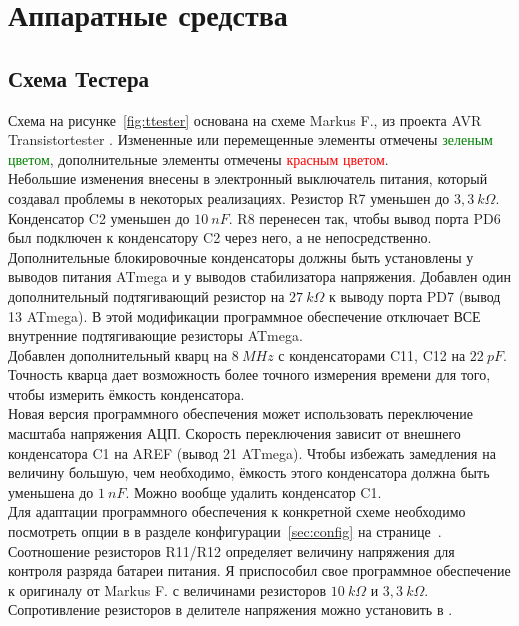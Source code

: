 \chapter{Аппаратные средства}

\section{Схема Тестера}
\label{sec:hardware}

Схема на рисунке~\ref{fig:ttester} основана на схеме Markus F., из проекта AVR Transistortester \cite{Frejek}.
Измененные или перемещенные элементы отмечены \textcolor{green}{зеленым цветом}, дополнительные элементы 
отмечены \textcolor{red}{красным цветом}.\\

Небольшие изменения внесены в электронный выключатель питания, который создавал проблемы в некоторых реализациях. 
Резистор R7 уменьшен до  \(3,3~k\Omega\). Конденсатор C2 уменьшен до \(10~nF\). R8 перенесен так, чтобы вывод порта 
PD6 был подключен к конденсатору C2 через него, а не непосредственно.\\

Дополнительные блокировочные конденсаторы должны быть установлены у выводов питания ATmega и у выводов стабилизатора 
напряжения. 
Добавлен один дополнительный подтягивающий резистор на \(27~k\Omega\) к выводу порта PD7 (вывод 13 ATmega). В этой 
модификации программное обеспечение отключает ВСЕ внутренние подтягивающие резисторы ATmega.\\
 
Добавлен дополнительный кварц на \(8~MHz\) с конденсаторами C11, C12 на \(22~pF\). Точность кварца дает возможность 
более точного измерения времени для того, чтобы измерить ёмкость конденсатора.\\

Новая версия программного обеспечения может использовать переключение масштаба напряжения АЦП. Скорость переключения 
зависит от внешнего конденсатора C1 на AREF (вывод 21 ATmega). Чтобы избежать замедления на величину большую, чем 
необходимо, ёмкость этого конденсатора должна быть уменьшена до \(1~nF\). Можно вообще удалить конденсатор C1.\\
Для адаптации программного обеспечения к конкретной схеме необходимо посмотреть опции в  в 
разделе конфигурации~\ref{sec:config} на странице~\pageref{sec:config}. \\

Соотношение резисторов R11/R12 определяет величину напряжения для контроля разряда батареи питания. Я приспособил свое 
программное обеспечение к оригиналу от  Markus F. \cite{Frejek} с величинами резисторов \(10~k\Omega\) и \(3,3~k\Omega\).
Сопротивление резисторов в делителе напряжения можно установить в .\\

